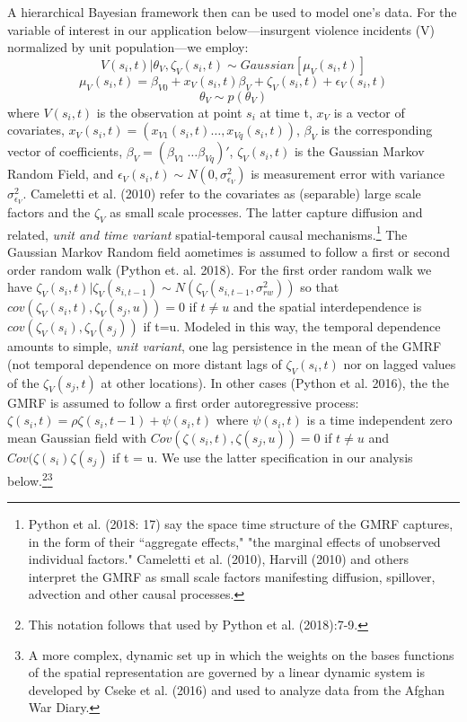 \documentclass[12pt]{article}
\begin{document}
A hierarchical Bayesian framework then can be used to model one's data. For the variable of interest in our application below---insurgent violence incidents (V)
normalized by unit population---we employ:
\begin{equation}
V(s_i,t)|\theta_V,\zeta_V(s_i,t) \sim Gaussian [\mu_V(s_i,t)]
\end{equation}
\begin{equation}
\mu_V(s_i,t) = \beta_{V0} + x_V(s_i,t)\beta_V + \zeta_V(s_i,t) + \epsilon_V(s_i,t)
\end{equation}
\begin{equation}
  \theta_V \sim p(\theta_V)
\end{equation}
where $V(s_i,t)$ is the observation at point $s_i$ at time t, $x_V$ is a vector of
covariates, $x_V(s_i,t)=(x_{V1}(s_i,t) \ldots, x_{Vq}(s_i,t))$, $\beta_V$ is the corresponding
vector of coefficients, $\beta_V = (\beta_{V1}\ \ldots \beta_{Vq})'$, $\zeta_V(s_i,t)$ is the Gaussian
Markov Random Field, and $\epsilon_{V}(s_i,t) \sim N(0,\sigma_{\epsilon_{V}}^2)$ is measurement error
with variance $\sigma_{\epsilon_V}^2$. Cameletti et al. (2010) refer to the covariates as (separable) large scale
factors and the $\zeta_V$ as small scale processes. The latter capture diffusion and related, \textit
{unit and time variant} spatial-temporal causal mechanisms.\footnote{Python et al. (2018: 17) say
the space time structure of the GMRF captures, in the form of their ``aggregate effects,"
"the marginal effects of unobserved individual factors."
Cameletti et al. (2010), Harvill (2010) and others interpret the GMRF as small scale factors
manifesting diffusion, spillover, advection and other causal processes.}
The Gaussian Markov Random field
aometimes is assumed to follow a first or second order random walk (Python et. al. 2018). For the first order random walk
we have $\zeta_{V}(s_i,t)|\zeta_{V}(s_{i,t-1}) \sim N(\zeta_{V}(s_{i,t-1},\sigma_{rw}^2))$ so
that $cov(\zeta_{V}(s_i,t),\zeta_{V}(s_j,u)) = 0$ if $t\ne u$ and the spatial interdependence is
$cov(\zeta_{V}(s_i),\zeta_{V}(s_j))$ if t=u. Modeled in this way, the temporal dependence amounts
to simple, \emph{unit variant}, one lag persistence in the mean of the GMRF (not temporal dependence on more distant
lags of $\zeta_V(s_i,t)$ nor on lagged values of the $\zeta_V(s_j,t)$ at other locations).
In other cases (Python et al. 2016), the the GMRF is assumed to follow a first order autoregressive
process: $\zeta(s_i,t) = \rho \zeta(s_i,t-1) + \psi(s_i,t)$ where $\psi(s_i,t)$ is a time independent
zero mean Gaussian field with $Cov(\zeta(s_i,t),\zeta(s_j,u)) = 0$ if $t \ne u$ and $Cov(\zeta(s_i)\zeta(s_j)$
if t = u. We use the latter specification in our analysis below.\footnote{This notation follows
that used by Python et al. (2018):7-9.}\footnote{A more complex, dynamic set up in which the
weights on the bases functions of the spatial representation are governed by a linear
dynamic system is developed by Cseke et al. (2016) and used to analyze data from the Afghan
War Diary.}
\end{document}
